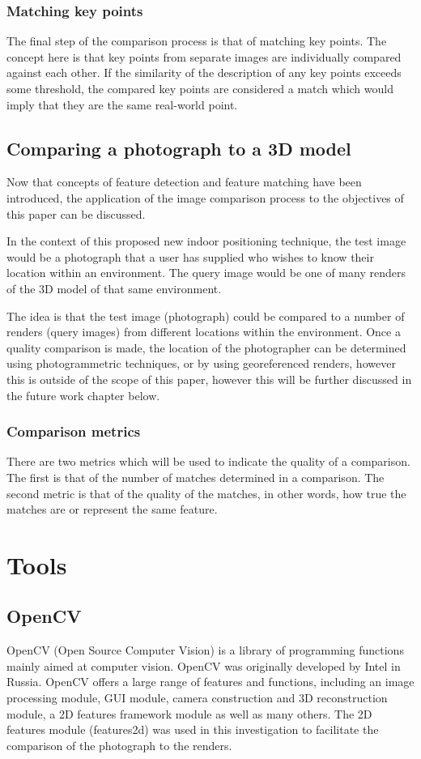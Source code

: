 \documentclass[11pt,a4paper]{report}
\begin{document}
			\subsubsection{Matching key points}
				The final step of the comparison process is that of matching key points. The concept here is that key points from separate images are individually compared against each other. If the similarity of the description of any key points exceeds some threshold, the compared key points are considered a match which would imply that they are the same real-world point.
		
		\subsection{Comparing a photograph to a 3D model}
			Now that concepts of feature detection and feature matching have been introduced, the application of the image comparison process to the objectives of this paper can be discussed.
			
			In the context of this proposed new indoor positioning technique, the test image would be a photograph that a user has supplied who wishes to know their location within an environment. The query image would be one of many renders of the 3D model of that same environment.
			
			The idea is that the test image (photograph) could be compared to a number of renders (query images) from different locations within the environment. Once a quality comparison is made, the location of the photographer can be determined using photogrammetric techniques, or by using georeferenced renders, however this is outside of the scope of this paper, however this will be further discussed in the future work chapter below.
			
			\subsubsection{Comparison metrics}
				There are two metrics which will be used to indicate the quality of a comparison. The first is that of the number of matches determined in a comparison.
				The second metric is that of the quality of the matches, in other words, how true the matches are or represent the same feature.
	
	\section{Tools}
		\subsection{OpenCV}
			OpenCV (Open Source Computer Vision) is a library of programming functions mainly aimed at computer vision. OpenCV was originally developed by Intel in Russia. OpenCV offers a large range of features and functions, including an image processing module, GUI module, camera construction and 3D reconstruction module, a 2D features framework module as well as many others. The 2D features module (features2d) was used in this investigation to facilitate the comparison of the photograph to the renders.
\end{document}
